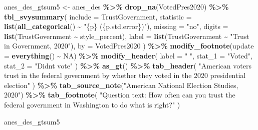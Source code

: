 \documentclass[
]{krantz}
\makeatletter
\newenvironment{Shaded}{\begin{snugshade}}{\end{snugshade}}
\newcommand{\AttributeTok}[1]{\textcolor[rgb]{0.27,0.27,0.27}{#1}}
\newcommand{\ConstantTok}[1]{\textcolor[rgb]{0.37,0.37,0.37}{#1}}
\newcommand{\FunctionTok}[1]{\textcolor[rgb]{0.27,0.27,0.27}{\textbf{#1}}}
\newcommand{\NormalTok}[1]{#1}
\newcommand{\OtherTok}[1]{\textcolor[rgb]{0.37,0.37,0.37}{#1}}
\newcommand{\SpecialCharTok}[1]{\textcolor[rgb]{0.43,0.43,0.43}{\textbf{#1}}}
\newcommand{\StringTok}[1]{\textcolor[rgb]{0.5,0.5,0.5}{#1}}
\newenvironment{kframe}{%
\medskip{}
\setlength{\fboxsep}{.8em}
 \def\at@end@of@kframe{}%
 \ifinner\ifhmode%
  \def\at@end@of@kframe{\end{minipage}}%
  \begin{minipage}{\columnwidth}%
 \fi\fi%
 \def\FrameCommand##1{\hskip\@totalleftmargin \hskip-\fboxsep
 \colorbox{shadecolor}{##1}\hskip-\fboxsep
     \hskip-\linewidth \hskip-\@totalleftmargin \hskip\columnwidth}%
 \MakeFramed {\advance\hsize-\width
   \@totalleftmargin\z@ \linewidth\hsize
   \@setminipage}}%
 {\par\unskip\endMakeFramed%
 \at@end@of@kframe}
\renewenvironment{Shaded}{\begin{kframe}}{\end{kframe}}
\makeatother
\begin{document}
\begin{Shaded}
\begin{Highlighting}[]
\NormalTok{anes\_des\_gtsum5 }\OtherTok{\textless{}{-}}\NormalTok{ anes\_des }\SpecialCharTok{\%\textgreater{}\%}
  \FunctionTok{drop\_na}\NormalTok{(VotedPres2020) }\SpecialCharTok{\%\textgreater{}\%}
  \FunctionTok{tbl\_svysummary}\NormalTok{(}
    \AttributeTok{include =}\NormalTok{ TrustGovernment,}
    \AttributeTok{statistic =} \FunctionTok{list}\NormalTok{(}\FunctionTok{all\_categorical}\NormalTok{() }\SpecialCharTok{\textasciitilde{}} \StringTok{"\{p\} (\{p.std.error\})"}\NormalTok{),}
    \AttributeTok{missing =} \StringTok{"no"}\NormalTok{,}
    \AttributeTok{digits =} \FunctionTok{list}\NormalTok{(TrustGovernment }\SpecialCharTok{\textasciitilde{}}\NormalTok{ style\_percent),}
    \AttributeTok{label =} \FunctionTok{list}\NormalTok{(TrustGovernment }\SpecialCharTok{\textasciitilde{}} \StringTok{"Trust in Government, 2020"}\NormalTok{),}
    \AttributeTok{by =}\NormalTok{ VotedPres2020}
\NormalTok{  ) }\SpecialCharTok{\%\textgreater{}\%}
  \FunctionTok{modify\_footnote}\NormalTok{(}\AttributeTok{update =} \FunctionTok{everything}\NormalTok{() }\SpecialCharTok{\textasciitilde{}} \ConstantTok{NA}\NormalTok{) }\SpecialCharTok{\%\textgreater{}\%}
  \FunctionTok{modify\_header}\NormalTok{(}
    \AttributeTok{label =} \StringTok{" "}\NormalTok{,}
    \AttributeTok{stat\_1 =} \StringTok{"Voted"}\NormalTok{,}
    \AttributeTok{stat\_2 =} \StringTok{"Didn\textquotesingle{}t vote"}
\NormalTok{  ) }\SpecialCharTok{\%\textgreater{}\%}
  \FunctionTok{as\_gt}\NormalTok{() }\SpecialCharTok{\%\textgreater{}\%}
  \FunctionTok{tab\_header}\NormalTok{(}
    \StringTok{"American voter\textquotesingle{}s trust}
\StringTok{             in the federal government by whether they voted}
\StringTok{             in the 2020 presidential election"}
\NormalTok{  ) }\SpecialCharTok{\%\textgreater{}\%}
  \FunctionTok{tab\_source\_note}\NormalTok{(}\StringTok{"American National Election Studies, 2020"}\NormalTok{) }\SpecialCharTok{\%\textgreater{}\%}
  \FunctionTok{tab\_footnote}\NormalTok{(}
    \StringTok{"Question text: How often can you trust the federal government}
\StringTok{               in Washington to do what is right?"}
\NormalTok{  )}
\end{Highlighting}
\end{Shaded}

\begin{Shaded}
\begin{Highlighting}[]
\NormalTok{anes\_des\_gtsum5}
\end{Highlighting}
\end{Shaded}
\end{document}
